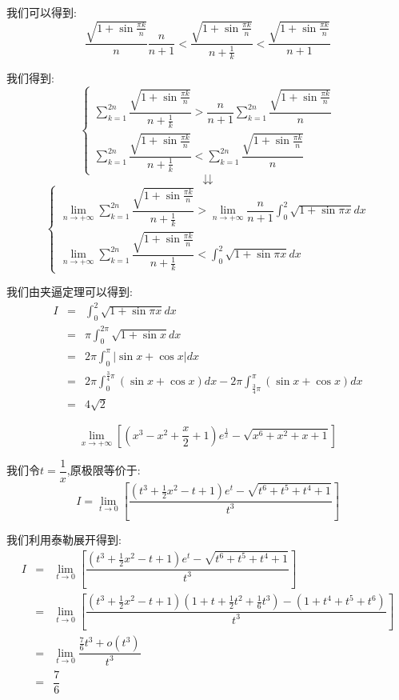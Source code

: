 \begin{solution}
	
	我们可以得到: 
	$$\dfrac{\sqrt{1+\sin \frac{\pi k}{n}}}{n}\dfrac{n}{n+1}<\dfrac{\sqrt{1+\sin \frac{\pi k}{n}}}{n+\frac{1}{k}}<\dfrac{\sqrt{1+\sin \frac{\pi k}{n}}}{n+1}$$
	
	我们得到: 
	$$\left\lbrace
	\begin{array}{l}
		\sum\limits_{k=1}^{2n}\dfrac{\sqrt{1+\sin \frac{\pi k}{n}}}{n+\frac{1}{k}}>\dfrac{n}{n+1}\sum\limits_{k=1}^{2n}\dfrac{\sqrt{1+\sin \frac{\pi k}{n}}}{n}\\
		\sum\limits_{k=1}^{2n}\dfrac{\sqrt{1+\sin \frac{\pi k}{n}}}{n+\frac{1}{k}}<\sum\limits_{k=1}^{2n}\dfrac{\sqrt{1+\sin \frac{\pi k}{n}}}{n}
	\end{array}
	\right.$$ 
	$$\downdownarrows$$ 
	$$\left\lbrace
	\begin{array}{l}
		\lim\limits_{n\to+\infty}\sum\limits_{k=1}^{2n}\dfrac{\sqrt{1+\sin \frac{\pi k}{n}}}{n+\frac{1}{k}}>\lim\limits_{n\to+\infty}\dfrac{n}{n+1}\int_{0}^{2}\sqrt{1+\sin \pi x}dx\\
		\lim\limits_{n\to+\infty}\sum\limits_{k=1}^{2n}\dfrac{\sqrt{1+\sin \frac{\pi k}{n}}}{n+\frac{1}{k}}<\int_{0}^{2}\sqrt{1+\sin \pi x}dx
	\end{array}
	\right. $$
	
	我们由夹逼定理可以得到: 
	\begin{eqnarray*}
		I&=&\int_{0}^{2}\sqrt{1+\sin \pi x}dx\\
		&=&\pi\int_{0}^{2\pi}\sqrt{1+\sin x}dx\\
		&=&2\pi\int_{0}^{\pi}|\sin x+\cos x|dx\\
		&=&2\pi\int_{0}^{\frac{3}{4}\pi}(\sin x+\cos x)dx-2\pi\int_{\frac{3}{4}\pi}^{\pi}(\sin x+\cos x)dx\\
		&=&4\sqrt{2}
	\end{eqnarray*}
\end{solution}

\begin{example}[][Exam: 32.4.8]
	$$\lim\limits_{x\to +\infty}\left[(x^3-x^2+\frac{x}{2}+1)e^{\frac{1}{x}}-\sqrt{x^6+x^2+x+1} \right]$$
\end{example}

\begin{solution}
	
	我们令$t=\dfrac{1}{x}$,原极限等价于: 
	$$I=\lim\limits_{t\to 0}\left[ \dfrac{(t^3+\frac{1}{2}x^2-t+1)e^t-\sqrt{t^6+t^5+t^4+1}}{t^3}\right] $$
	
	我们利用泰勒展开得到: 
	\begin{eqnarray*}
		I&=&\lim\limits_{t\to 0}\left[ \dfrac{(t^3+\frac{1}{2}x^2-t+1)e^t-\sqrt{t^6+t^5+t^4+1}}{t^3}\right]\\
		&=&\lim\limits_{t\to 0}\left[ \dfrac{(t^3+\frac{1}{2}x^2-t+1)(1+t+\frac{1}{2}t^2+\frac{1}{6}t^3)-(1+t^4+t^5+t^6)}{t^3}\right]\\
		&=&\lim\limits_{t\to 0}\dfrac{\frac{7}{6}t^3+o(t^3)}{t^3}\\
		&=&\dfrac{7}{6}
	\end{eqnarray*}
\end{solution}


